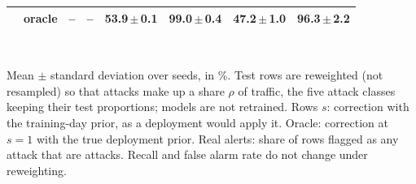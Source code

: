 \begin{table}[t]
\begin{tabular}{llrrrrrr}
 & oracle & -- & -- & 53.9{\,}$\pm${\,}0.1 & 99.0{\,}$\pm${\,}0.4 & 47.2{\,}$\pm${\,}1.0 & 96.3{\,}$\pm${\,}2.2 \\
\bottomrule
\end{tabular}
\\[2pt]
\parbox{\linewidth}{\scriptsize Mean $\pm$ standard deviation over  seeds, in \%. Test rows are reweighted (not resampled) so that attacks make up a share $\rho$ of traffic, the five attack classes keeping their test proportions; models are not retrained. Rows $s$: correction with the training-day prior, as a deployment would apply it. Oracle: correction at $s=1$ with the true deployment prior. Real alerts: share of rows flagged as any attack that are attacks. Recall and false alarm rate do not change under reweighting.}
\end{table}
